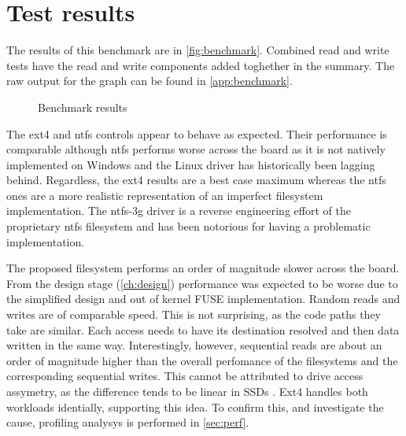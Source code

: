     \section{Test results}

        The results of this benchmark are in \autoref{fig:benchmark}.
        Combined read and write tests have the read and write components added
        toghether in the summary. The raw output for the graph can be found in
        \autoref{app:benchmark}.

        \begin{figure}[h]
            \caption{Benchmark results}
            
            \label{fig:benchmark}
        \end{figure}

        The ext4 and ntfs controls appear to behave as expected. Their
        performance is comparable although ntfs performs worse across the board
        as it is not natively implemented on Windows and the Linux driver has
        historically been lagging behind. Regardless, the ext4 results are a
        best case maximum whereas the ntfs ones are a more realistic
        representation of an imperfect filesystem implementation. The ntfs-3g
        driver is a reverse engineering effort of the proprietary ntfs
        filesystem and has been notorious for having a problematic
        implementation.

        The proposed filesystem performs an order of magnitude slower across
        the board. From the design stage (\autoref{ch:design}) performance was
        expected to be worse due to the simplified design and out of kernel
        FUSE implementation. Random reads and writes are of comparable speed.
        This is not surprising, as the code paths they take are similar. Each
        access needs to have its destination resolved and then data written in
        the same way. Interestingly, however, sequential reads are about an
        order of magnitude higher than the overall perfomance of the
        filesystems and the corresponding sequential writes. This cannot be
        attributed to drive access assymetry, as the difference tends to be
        linear in SSDs \cite{servethehome_review}. Ext4 handles both workloads
        identially, supporting this idea. To confirm this, and investigate the
        cause, profiling analysys is performed in \autoref{sec:perf}.

